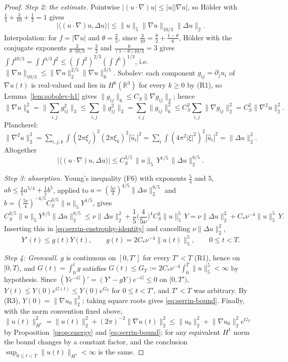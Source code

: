 \documentclass[11pt]{article}
\theoremstyle{definition}
\theoremstyle{plain}
\newcommand{\R}{\mathbb R}
\newcommand{\norm}[1]{\lVert #1\rVert}
\begin{document}
\begin{proof}
\emph{Step 2: the estimate.}  Pointwise $|(u\cdot\nabla)u|\leq|u||\nabla u|$,
so H\"older with $\frac15+\frac3{10}+\frac12=1$ gives
\[
 \big|\langle(u\cdot\nabla)u,\Delta u\rangle\big|
 \leq\norm u_5\norm{\nabla u}_{10/3}\norm{\Delta u}_2 .
\]
Interpolation: for $f=|\nabla u|$ and $\theta=\frac25$, since
$\frac3{10}=\frac\theta2+\frac{1-\theta}6$, H\"older with the conjugate
exponents $\frac{2}{\theta\cdot10/3}=\frac32$ and $\frac{6}{(1-\theta)10/3}=3$
gives
$\int f^{10/3}=\int f^{4/3}f^{2}\leq(\int f^2)^{2/3}(\int f^6)^{1/3}$,
i.e.\ $\norm{\nabla u}_{10/3}\leq\norm{\nabla u}_2^{2/5}\norm{\nabla u}_6^{3/5}$.
Sobolev: each component $g_{ij}=\partial_ju_i$ of $\nabla u(t)$ is
real-valued and lies in $H^k(\R^3)$ for every $k\geq0$ by (R1), so
Lemma~\ref{lem:sobolev-h1} gives $\norm{g_{ij}}_6\leq C_S\norm{\nabla g_{ij}}_2$;
hence
\[
 \norm{\nabla u}_6^2=\Big\|\sum_{i,j}g_{ij}^2\Big\|_3
 \leq\sum_{i,j}\norm{g_{ij}^2}_3=\sum_{i,j}\norm{g_{ij}}_6^2
 \leq C_S^2\sum_{i,j}\norm{\nabla g_{ij}}_2^2=C_S^2\norm{\nabla^2u}_2^2 .
\]
Plancherel: $\norm{\nabla^2u}_2^2=\sum_{i,j,k}\int(2\pi\xi_j)^2(2\pi\xi_k)^2|\hat u_i|^2
=\sum_i\int(4\pi^2|\xi|^2)^2|\hat u_i|^2=\norm{\Delta u}_2^2$.  Altogether
\[
 \big|\langle(u\cdot\nabla)u,\Delta u\rangle\big|
 \leq C_S^{3/5}\,\norm u_5\,Y^{1/5}\,\norm{\Delta u}_2^{8/5}.
\]

\emph{Step 3: absorption.}  Young's inequality (F6) with exponents $\frac54$
and $5$, $ab\leq\frac45a^{5/4}+\frac15b^5$, applied to
$a=(\tfrac{5\nu}4)^{4/5}\norm{\Delta u}_2^{8/5}$ and
$b=(\tfrac{5\nu}4)^{-4/5}C_S^{3/5}\norm u_5Y^{1/5}$, gives
\[
 C_S^{3/5}\norm u_5Y^{1/5}\norm{\Delta u}_2^{8/5}
 \leq\nu\norm{\Delta u}_2^2+\frac15\Big(\frac4{5\nu}\Big)^4C_S^3\norm u_5^5\,Y
 =\nu\norm{\Delta u}_2^2+C_*\nu^{-4}\norm u_5^5\,Y .
\]
Inserting this in \eqref{eq:serrin-enstrophy-identity} and cancelling
$\nu\norm{\Delta u}_2^2$,
\[
 Y'(t)\leq g(t)Y(t),\qquad g(t)=2C_*\nu^{-4}\norm{u(t)}_5^5,\qquad0\leq t<T .
\]

\emph{Step 4: Gronwall.}  $g$ is continuous on $[0,T']$ for every $T'<T$
(R1), hence on $[0,T)$, and $G(t)=\int_0^tg$ satisfies
$G(t)\leq G_T:=2C_*\nu^{-4}\int_0^T\norm u_5^5<\infty$ by hypothesis.  Since
$(Ye^{-G})'=(Y'-gY)e^{-G}\leq0$ on $[0,T')$, $Y(t)\leq Y(0)e^{G(t)}\leq Y(0)e^{G_T}$
for $0\leq t<T'$, and $T'<T$ was arbitrary.  By (R3), $Y(0)=\norm{\nabla u_0}_2^2$;
taking square roots gives \eqref{eq:serrin-bound}.  Finally, with the norm
convention fixed above,
$\norm{u(t)}_{H^1}^2=\norm{u(t)}_2^2+(2\pi)^{-2}\norm{\nabla u(t)}_2^2
\leq\norm{u_0}_2^2+\norm{\nabla u_0}_2^2e^{G_T}$ by
Proposition~\ref{prop:energy} and \eqref{eq:serrin-bound}; for any
equivalent $H^1$ norm the bound changes by a constant factor, and the
conclusion $\sup_{0\leq t<T}\norm{u(t)}_{H^1}<\infty$ is the same.
\end{proof}
\end{document}
